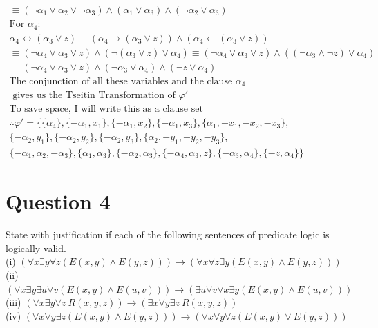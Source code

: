 \documentclass[12pt]{fphw}
\begin{document}
\begin{gather*}
  \equiv (\neg \alpha_1 \vee \alpha_2 \vee \neg \alpha_3) \wedge (\alpha_1 \vee \alpha_3) \wedge (\neg \alpha_2 \vee \alpha_3) \\
  \text{For } \alpha_4: \\
  \alpha_4 \leftrightarrow (\alpha_3 \vee z) \equiv (\alpha_4 \to (\alpha_3 \vee z)) \wedge (\alpha_4 \leftarrow (\alpha_3 \vee z)) \\ 
  \equiv (\neg \alpha_4 \vee \alpha_3 \vee z) \wedge (\neg (\alpha_3 \vee z) \vee \alpha_4) \equiv (\neg \alpha_4 \vee \alpha_3 \vee z) \wedge ((\neg \alpha_3 \wedge \neg z) \vee \alpha_4) \\
  \equiv (\neg \alpha_4 \vee \alpha_3 \vee z) \wedge (\neg \alpha_3 \vee \alpha_4) \wedge (\neg z \vee \alpha_4) \\
  \text{The conjunction of all these variables and the clause } \alpha_4 \\
  \text{ gives us the Tseitin Transformation of } \varphi' \\
  \text{To save space, I will write this as a clause set} \\
  \therefore \varphi' = \{\{\alpha_4\}, \{-\alpha_1, x_1\}, \{-\alpha_1, x_2\}, \{-\alpha_1, x_3\}, \{\alpha_1, -x_1, -x_2, -x_3\}, \\ \{-\alpha_2, y_1\}, \{-\alpha_2, y_2\}, \{-\alpha_2, y_3\}, \{\alpha_2, -y_1, -y_2, -y_3\}, \\ \{-\alpha_1, \alpha_2, -\alpha_3\}, \{\alpha_1, \alpha_3\}, \{-\alpha_2, \alpha_3\}, \{-\alpha_4, \alpha_3, z\}, \{-\alpha_3, \alpha_4\}, \{-z, \alpha_4\}\}
\end{gather*}

\section*{Question 4}

\begin{problem}
  State with justification if each of the following sentences of predicate logic is logically valid. \\
  (i) $(\forall x \exists y \forall z (E(x,y) \wedge E(y,z))) \to (\forall x \forall z \exists y (E(x,y) \wedge E(y,z)))$ \\
  (ii) $(\forall x \exists y \exists u \forall v (E(x,y) \wedge E(u,v))) \to (\exists u \forall v \forall x \exists y (E(x,y) \wedge E(u,v)))$ \\
  (iii) $(\forall x \exists y \forall z \ R(x,y,z)) \to (\exists x \forall y \exists z \ R(x,y,z))$ \\
  (iv) $(\forall x \forall y \exists z (E(x,y) \wedge E(y,z))) \to (\forall x \forall y \forall z (E(x,y) \vee E(y,z)))$
\end{problem}
\end{document}
